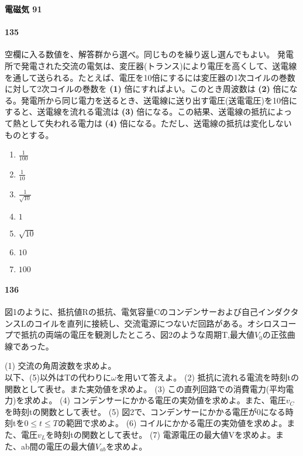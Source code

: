\documentclass[a4paper, 10pt, dvipdfmx]{bxjsarticle}
\begin{document}
\noindent
\textbf{電磁気 91}

\paragraph{135} 空欄に入る数値を、解答群から選べ。同じものを繰り返し選んでもよい。
発電所で発電された交流の電気は、変圧器(トランス)により電圧を高くして、送電線を通して送られる。たとえば、電圧を10倍にするには変圧器の1次コイルの巻数に対して2次コイルの巻数を \textbf{(1)} 倍にすればよい。このとき周波数は \textbf{(2)} 倍になる。発電所から同じ電力を送るとき、送電線に送り出す電圧(送電電圧)を10倍にすると、送電線を流れる電流は \textbf{(3)} 倍になる。この結果、送電線の抵抗によって熱として失われる電力は \textbf{(4)} 倍になる。ただし、送電線の抵抗は変化しないものとする。

\begin{enumerate}[label=(\arabic*)]
    \item $\frac{1}{100}$
    \item $\frac{1}{10}$
    \item $\frac{1}{\sqrt{10}}$
    \item $1$
    \item $\sqrt{10}$
    \item $10$
    \item $100$
\end{enumerate}

\paragraph{136} 図1のように、抵抗値Rの抵抗、電気容量Cのコンデンサーおよび自己インダクタンスLのコイルを直列に接続し、交流電源につないだ回路がある。オシロスコープで抵抗の両端の電圧を観測したところ、図2のような周期T,最大値$V_0$の正弦曲線であった。
\begin{center}
     \quad {}
\end{center}
(1) 交流の角周波数を求めよ。\\
以下、(5)以外はTの代わりに$\omega$を用いて答えよ。
(2) 抵抗に流れる電流を時刻tの関数として表せ。また実効値を求めよ。
(3) この直列回路での消費電力(平均電力)を求めよ。
(4) コンデンサーにかかる電圧の実効値を求めよ。また、電圧$v_C$を時刻tの関数として表せ。
(5) 図2で、コンデンサーにかかる電圧が0になる時刻tを$0 \le t \le T$の範囲で求めよ。
(6) コイルにかかる電圧の実効値を求めよ。また、電圧$v_L$を時刻tの関数として表せ。
(7) 電源電圧の最大値Vを求めよ。また、ab間の電圧の最大値$V_{ab}$を求めよ。
\end{document}
